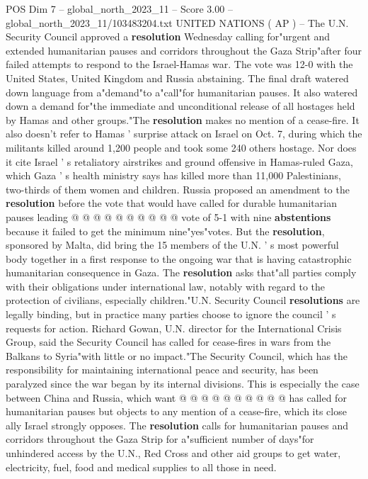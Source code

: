 \begin{textsample}{POS Dim 7 – global\_north\_2023\_11 – Score 3.00 – global\_north\_2023\_11/103483204.txt}  \label{ex:f7_pos_401}
UNITED NATIONS ( AP ) -- The U.N.
Security Council approved a \textbf{resolution} Wednesday calling for"urgent and extended humanitarian pauses and corridors throughout the Gaza Strip"after four failed attempts to respond to the Israel-Hamas war.
The vote was 12-0 with the United States, United Kingdom and Russia abstaining.
The final draft watered down language from a"demand"to a"call"for humanitarian pauses.
It also watered down a demand for"the immediate and unconditional release of all hostages held by Hamas and other groups."The \textbf{resolution} makes no mention of a cease-fire.
It also doesn't refer to Hamas ' surprise attack on Israel on Oct. 7, during which the militants killed around 1,200 people and took some 240 others hostage.
Nor does it cite Israel ' s retaliatory airstrikes and ground offensive in Hamas-ruled Gaza, which Gaza ' s health ministry says has killed more than 11,000 Palestinians, two-thirds of them women and children.
Russia proposed an amendment to the \textbf{resolution} before the vote that would have called for durable humanitarian pauses leading @ @ @ @ @ @ @ @ @ @ vote of 5-1 with nine \textbf{abstentions} because it failed to get the minimum nine"yes"votes.
But the \textbf{resolution}, sponsored by Malta, did bring the 15 members of the U.N. ' s most powerful body together in a first response to the ongoing war that is having catastrophic humanitarian consequence in Gaza.
The \textbf{resolution} asks that"all parties comply with their obligations under international law, notably with regard to the protection of civilians, especially children."U.N.
Security Council \textbf{resolutions} are legally binding, but in practice many parties choose to ignore the council ' s requests for action.
Richard Gowan, U.N. director for the International Crisis Group, said the Security Council has called for cease-fires in wars from the Balkans to Syria"with little or no impact."The Security Council, which has the responsibility for maintaining international peace and security, has been paralyzed since the war began by its internal divisions.
This is especially the case between China and Russia, which want @ @ @ @ @ @ @ @ @ @ has called for humanitarian pauses but objects to any mention of a cease-fire, which its close ally Israel strongly opposes.
The \textbf{resolution} calls for humanitarian pauses and corridors throughout the Gaza Strip for a"sufficient number of days"for unhindered access by the U.N., Red Cross and other aid groups to get water, electricity, fuel, food and medical supplies to all those in need.

\end{textsample}
